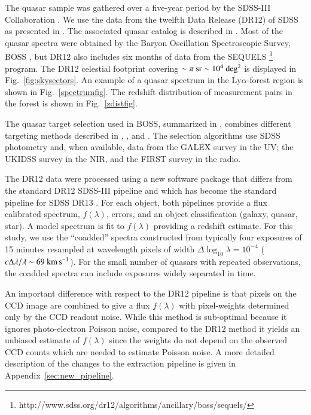 \documentclass{aa}
\newcommand{\lya}{Ly$\alpha$}
\begin{document}
The quasar sample  was gathered over a five-year period
by the SDSS-III Collaboration
\citep{2011AJ....142...72E, %
1998AJ....116.3040G, %
2006AJ....131.2332G, %
2013AJ....146...32S%
}.
We use the data from  the twelfth Data Release (DR12) of SDSS
as presented in 
\citet{2015ApJS..219...12A}.
The associated quasar catalog is described in \citet{2016arXiv160806483P}.
Most of the quasar spectra were obtained by
the Baryon Oscillation Spectroscopic Survey, BOSS \citep{2013AJ....145...10D},
but DR12 also includes six months of data from the SEQUELS 
\footnote{http://www.sdss.org/dr12/algorithms/ancillary/boss/sequels/} program.
The DR12 celestial footprint covering
$\sim\pi~\rm{sr}\sim10^4~{\rm deg^2}$
is displayed in 
Fig.~\ref{fig:skysectors}.
An example of a quasar spectrum in the \lya-forest region is shown
in Fig.~\ref{spectrumfig}.
The redshift distribution of measurement pairs in the forest is shown
in Fig.~\ref{zdistfig}.

The quasar target selection used in BOSS, summarized in
\citet{2012ApJS..199....3R},  combines different targeting methods described
in \citet{2010A&A...523A..14Y}, \citet{2011ApJ...743..125K}, and
\citet{2011ApJ...729..141B}.
The selection algorithms use SDSS photometry and, when available,
data from
the GALEX survey \citep{2005ApJ...619L...1M} in the UV;
the UKIDSS survey \citep{2007MNRAS.379.1599L} in the NIR,
and the FIRST survey \citep{1995ApJ...450..559B} in the radio.


The DR12 data were  processed using a new software package that differs
from the standard DR12 SDSS-III pipeline 
\citep{2012AJ....144..144B} 
and which has become the standard
pipeline for SDSS DR13 \citep{2016arXiv160802013S}.
For each object,
both pipelines provide a flux calibrated spectrum, $f(\lambda)$, errors,
and an object classification (galaxy, quasar, star).
A model spectrum is fit to $f(\lambda)$ providing  
a redshift estimate.
For this study,
we use the ``coadded'' spectra constructed from
typically four exposures of 15 minutes resampled at
wavelength pixels of width 
$\Delta\log_{10}\lambda=10^{-4}$ 
($c\Delta\lambda/\lambda\sim{\rm 69~km\,s^{-1}}$).
For the small number of quasars with repeated observations,
the coadded spectra can include exposures widely separated
in time.

An important difference with respect to the DR12 pipeline
is that pixels on the CCD image are combined to give a flux $f(\lambda)$
with pixel-weights determined only by the CCD readout noise.
While this method is sub-optimal because it ignores photo-electron Poisson
noise, compared to the DR12 method
it yields an unbiased estimate of $f(\lambda)$ 
since the weights do not depend
on the observed CCD counts which are needed to estimate Poisson noise.
A more detailed description of the changes to the extraction pipeline 
is given in Appendix~\ref{sec:new_pipeline}.
\end{document}
